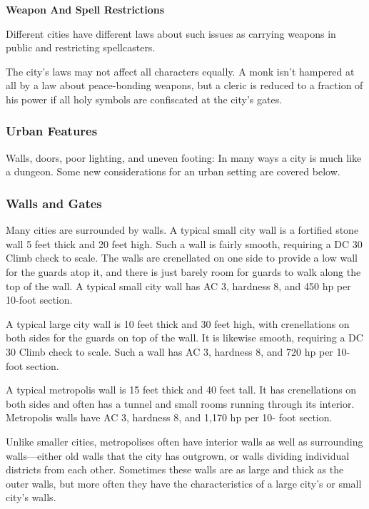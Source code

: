 \documentclass{article}
\begin{document}
\parindent=0pt
\textbf{Weapon And Spell Restrictions}

Different cities have different laws about such issues as carrying weapons in public 
and restricting spellcasters.

The city's laws may not affect all characters equally. A monk isn't hampered at 
all by a law about peace-bonding weapons, but a cleric is reduced to a fraction 
of his power if all holy symbols are confiscated at the city's gates.

\subsubsection*{\textbf{Urban Features}}

Walls, doors, poor lighting, and uneven footing: In many ways a city is much like 
a dungeon. Some new considerations for an urban setting are covered below.

\vspace{12pt}
\subsubsection*{\textbf{Walls and Gates}}

Many cities are surrounded by walls. A typical small city wall is a fortified stone 
wall 5 feet thick and 20 feet high. Such a wall is fairly smooth, requiring a DC 
30 Climb check to scale. The walls are crenellated on one side to provide a low 
wall for the guards atop it, and there is just barely room for guards to walk along 
the top of the wall. A typical small city wall has AC 3, hardness 8, and 450 hp 
per 10-foot section.

A typical large city wall is 10 feet thick and 30 feet high, with crenellations 
on both sides for the guards on top of the wall. It is likewise smooth, requiring 
a DC 30 Climb check to scale. Such a wall has AC 3, hardness 8, and 720 hp per 
10-foot section.

A typical metropolis wall is 15 feet thick and 40 feet tall. It has crenellations 
on both sides and often has a tunnel and small rooms running through its interior. 
Metropolis walls have AC 3, hardness 8, and 1,170 hp per 10- foot section.

Unlike smaller cities, metropolises often have interior walls as well as surrounding 
walls---either old walls that the city has outgrown, or walls dividing individual 
districts from each other. Sometimes these walls are as large and thick as the 
outer walls, but more often they have the characteristics of a large city's or 
small city's walls.
\end{document}
